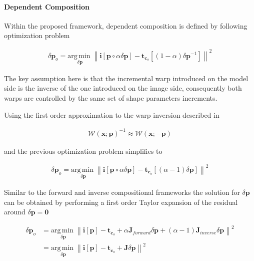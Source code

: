 \paragraph{Dependent Composition}

Within the proposed framework, dependent composition is defined by following optimization problem

\begin{equation}
	\begin{aligned}
		\delta \mathbf{p}_o = \underset{\delta \mathbf{p}}{\mathrm{arg\,min\;}}
		\left\| \mathbf{i}[\mathbf{p} \circ \alpha \delta \mathbf{p}] - \mathbf{t}_{\mathbf{c}_o}[(1-\alpha) \delta \mathbf{p}^{-1}] \right\|^2
	\end{aligned}
\end{equation}

The key assumption here is that the incremental warp introduced on the model side is the inverse of the one introduced on the image side, consequently both warps are controlled by the same set of shape parameters increments.

Using the first order approximation to the warp inversion described in \cite{}

\begin{equation}
	\begin{aligned}
		\mathcal{W}(\mathbf{x}; \mathbf{p})^{-1} \approx \mathcal{W}(\mathbf{x}; -\mathbf{p})
	\end{aligned}
\end{equation}

and the previous optimization problem simplifies to

\begin{equation}
	\begin{aligned}
		\delta \mathbf{p}_o = \underset{\delta \mathbf{p}}{\mathrm{arg\,min\;}}
		\left\| \mathbf{i}[\mathbf{p} \circ \alpha \delta \mathbf{p}] - \mathbf{t}_{\mathbf{c}_o}[(\alpha - 1) \delta \mathbf{p}] \right\|^2
	\end{aligned}
\end{equation}

Similar to the forward and inverse compositional frameworks the solution for $\delta \mathbf{p}$ can be obtained by performing a first order Taylor expansion of the residual around $\delta \mathbf{p} = \mathbf{0}$

\begin{equation}
	\begin{aligned}
		\delta \mathbf{p}_o & = \underset{\delta \mathbf{p}}{\mathrm{arg\,min\;}}
		\left\| \mathbf{i}[\mathbf{p}] - \mathbf{t}_{\mathbf{c}_o} + \alpha \mathbf{J}_{forward} \delta \mathbf{p} + (\alpha - 1) \mathbf{J}_{inverse} \delta \mathbf{p} \right\|^2
		\\
		& = \underset{\delta \mathbf{p}}{\mathrm{arg\,min\;}}
		\left\| \mathbf{i}[\mathbf{p}] - \mathbf{t}_{\mathbf{c}_o} + \mathbf{J} \delta \mathbf{p} \right\|^2
	\end{aligned}
\end{equation}

